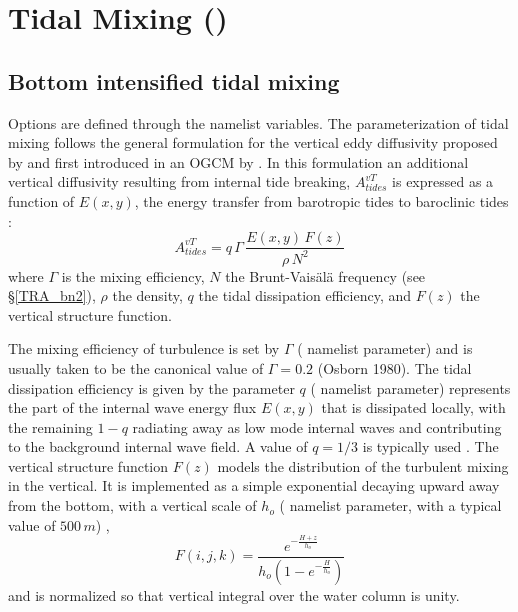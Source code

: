 \documentclass[NEMO_book]{subfiles}
\begin{document}
\section{Tidal Mixing ()}
\label{ZDF_tmx}



\subsection{Bottom intensified tidal mixing}
\label{ZDF_tmx_bottom}

Options are defined through the   namelist variables.
The parameterization of tidal mixing follows the general formulation for 
the vertical eddy diffusivity proposed by \citet{St_Laurent_al_GRL02} and 
first introduced in an OGCM by \citep{Simmons_al_OM04}. 
In this formulation an additional vertical diffusivity resulting from internal tide breaking, 
$A^{vT}_{tides}$ is expressed as a function of $E(x,y)$, the energy transfer from barotropic 
tides to baroclinic tides : 
\begin{equation} \label{Eq_Ktides}
A^{vT}_{tides} =  q \,\Gamma \,\frac{ E(x,y) \, F(z) }{ \rho \, N^2 }
\end{equation}
where $\Gamma$ is the mixing efficiency, $N$ the Brunt-Vais\"{a}l\"{a} frequency 
(see \S\ref{TRA_bn2}), $\rho$ the density, $q$ the tidal dissipation efficiency, 
and $F(z)$ the vertical structure function. 

The mixing efficiency of turbulence is set by $\Gamma$ ( namelist parameter)
and is usually taken to be the canonical value of $\Gamma = 0.2$ (Osborn 1980). 
The tidal dissipation efficiency is given by the parameter $q$ ( namelist parameter) 
represents the part of the internal wave energy flux $E(x, y)$ that is dissipated locally, 
with the remaining $1-q$ radiating away as low mode internal waves and 
contributing to the background internal wave field. A value of $q=1/3$ is typically used  
\citet{St_Laurent_al_GRL02}.
The vertical structure function $F(z)$ models the distribution of the turbulent mixing in the vertical. 
It is implemented as a simple exponential decaying upward away from the bottom, 
with a vertical scale of $h_o$ ( namelist parameter, with a typical value of $500\,m$) \citep{St_Laurent_Nash_DSR04}, 
\begin{equation} \label{Eq_Fz}
F(i,j,k) = \frac{ e^{ -\frac{H+z}{h_o} } }{ h_o \left( 1- e^{ -\frac{H}{h_o} } \right) }
\end{equation}
and is normalized so that vertical integral over the water column is unity. 
\end{document}
